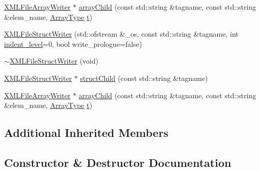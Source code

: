 \begin{DoxyCompactItemize}
\mbox{\hyperlink{classXMLStructWriterAPI_1_1XMLFileArrayWriter}{X\+M\+L\+File\+Array\+Writer}} $\ast$ \mbox{\hyperlink{classXMLStructWriterAPI_1_1XMLFileStructWriter_a45906f3eaab392974dde2da7cf1fef05}{array\+Child}} (const std\+::string \&tagname, const std\+::string \&elem\+\_\+name, \mbox{\hyperlink{namespaceXMLStructWriterAPI_a2017208be87c77a32bdc19ea2f14d032}{Array\+Type}} \mbox{\hyperlink{adat__devel_2lib_2hadron_2hadron__timeslice_8cc_ac310d9181e916ba43604099aee272c71}{t}})
\item 
\mbox{\hyperlink{classXMLStructWriterAPI_1_1XMLFileStructWriter_a7045796a887cf66a8ee5a355a1f3c4a9}{X\+M\+L\+File\+Struct\+Writer}} (std\+::ofstream \&\+\_\+os, const std\+::string \&tagname, int \mbox{\hyperlink{classXMLStructWriterAPI_1_1XMLStructWriterBase_ac592a077855a1377b390f4abff506e38}{indent\+\_\+level}}=0, bool write\+\_\+prologue=false)
\item 
\mbox{\hyperlink{classXMLStructWriterAPI_1_1XMLFileStructWriter_a28ac83ac02b6b4e4e67f9a767320155d}{$\sim$\+X\+M\+L\+File\+Struct\+Writer}} (void)
\item 
\mbox{\hyperlink{classXMLStructWriterAPI_1_1XMLFileStructWriter}{X\+M\+L\+File\+Struct\+Writer}} $\ast$ \mbox{\hyperlink{classXMLStructWriterAPI_1_1XMLFileStructWriter_a29ff0f4353991294bab0c75ab8895f73}{struct\+Child}} (const std\+::string \&tagname)
\item 
\mbox{\hyperlink{classXMLStructWriterAPI_1_1XMLFileArrayWriter}{X\+M\+L\+File\+Array\+Writer}} $\ast$ \mbox{\hyperlink{classXMLStructWriterAPI_1_1XMLFileStructWriter_a45906f3eaab392974dde2da7cf1fef05}{array\+Child}} (const std\+::string \&tagname, const std\+::string \&elem\+\_\+name, \mbox{\hyperlink{namespaceXMLStructWriterAPI_a2017208be87c77a32bdc19ea2f14d032}{Array\+Type}} \mbox{\hyperlink{adat__devel_2lib_2hadron_2hadron__timeslice_8cc_ac310d9181e916ba43604099aee272c71}{t}})
\end{DoxyCompactItemize}
\subsection*{Additional Inherited Members}


\subsection{Constructor \& Destructor Documentation}
\mbox{\label{classXMLStructWriterAPI_1_1XMLFileStructWriter_a7045796a887cf66a8ee5a355a1f3c4a9}} 

